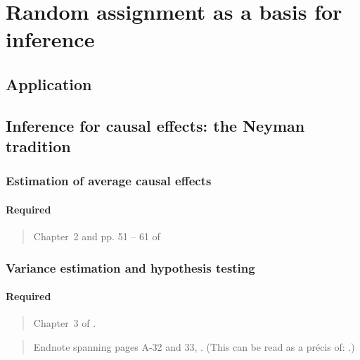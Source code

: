 \documentclass[12pt]{article}
\begin{document}
\section{Random assignment as a basis for inference}

\subsection*{Application}

\begin{verse}  \end{verse}

\subsection{Inference for causal effects: the Neyman tradition}

\subsubsection{Estimation of average causal effects}

\paragraph*{Required}

\begin{verse} Chapter~2 and pp. 51 -- 61 of  \end{verse}
\begin{verse}  \end{verse}
\begin{verse}  \end{verse}

\subsubsection{Variance estimation and hypothesis testing}

\paragraph*{Required}

\begin{verse}
  Chapter~3 of .
\end{verse}

\begin{verse} Endnote spanning pages A-32 and 33,
  .  (This can be read as a pr{\'e}cis
  of: .)
\end{verse}
\end{document}
